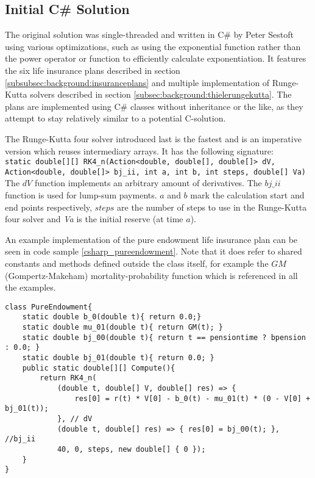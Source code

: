 \subsection{Initial C\# Solution}\label{subsec:initialsolution}
The original solution was single-threaded and written in C\# by Peter Sestoft using various optimizations, such as using the exponential function rather than the power operator or function to efficiently calculate exponentiation.
It features the six life insurance plans described in section \ref{subsubsec:background:insuranceplans} and multiple implementation of Runge-Kutta solvers described in section \ref{subsec:background:thielerungekutta}.
The plans are implemented using C\# classes without inheritance or the like, as they attempt to stay relatively similar to a potential C-solution.

The Runge-Kutta four solver introduced last is the fastest and is an imperative version which reuses intermediary arrays.
It has the following signature: \\
\lstinline$static double[][] RK4_n(Action<double, double[], double[]> dV, Action<double, double[]> bj_ii, int a, int b, int steps, double[] Va)$
\\
The $dV$ function implements an arbitrary amount of derivatives.
The $bj\_ii$ function is used for lump-sum payments.
$a$ and $b$ mark the calculation start and end points respectively, $steps$ are the number of steps to use in the Runge-Kutta four solver and \textit{Va} is the initial reserve (at time $a$).

An example implementation of the pure endowment life insurance plan can be seen in code sample \ref{csharp_pureendowment}. 
Note that it does refer to shared constants and methods defined outside the class itself, for example the $GM$ (Gompertz-Makeham) mortality-probability function which is referenced in all the examples.
\begin{lstlisting}[language=CSharp, caption=The pure endowment insurance plan expressed in C\#, label=csharp_pureendowment]
class PureEndowment{
    static double b_0(double t){ return 0.0;}
    static double mu_01(double t){ return GM(t); }
    static double bj_00(double t){ return t == pensiontime ? bpension : 0.0; }
    static double bj_01(double t){ return 0.0; }
    public static double[][] Compute(){
        return RK4_n(
            (double t, double[] V, double[] res) => { 
                res[0] = r(t) * V[0] - b_0(t) - mu_01(t) * (0 - V[0] + bj_01(t)); 
            }, // dV
            (double t, double[] res) => { res[0] = bj_00(t); }, //bj_ii
            40, 0, steps, new double[] { 0 });
    }
}
\end{lstlisting}

